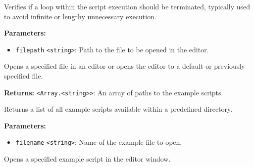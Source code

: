 \documentclass[12pt,a4paper]{article}
\begin{document}
\vspace{5mm}
\noindent {}


\noindent Verifies if a loop within the script execution should be terminated, typically used to avoid infinite or lengthy unnecessary execution.

\vspace{5mm}
\noindent {}


\noindent \textbf{Parameters:}
\begin{itemize}
  \item \texttt{filepath} \texttt{<string>}: Path to the file to be opened in the editor.
\end{itemize}

\noindent Opens a specified file in an editor or opens the editor to a default or previously specified file.

\vspace{5mm}
\noindent {}


\noindent \textbf{Returns:} \texttt{<Array.<string>>}: An array of paths to the example scripts.

\noindent Returns a list of all example scripts available within a predefined directory.

\vspace{5mm}
\noindent {}


\noindent \textbf{Parameters:}
\begin{itemize}
  \item \texttt{filename} \texttt{<string>}: Name of the example file to open.
\end{itemize}

\noindent Opens a specified example script in the editor window.

\vspace{5mm}
\noindent {}
\end{document}
